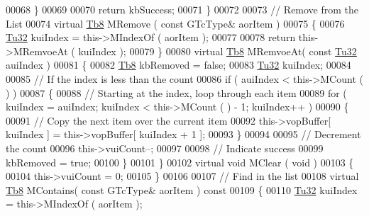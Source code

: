 \begin{DoxyCode}
00068             \}
00069 
00070             \textcolor{keywordflow}{return} kbSuccess;
00071          \}
00072          
00073          \textcolor{comment}{// Remove from the List}
00074          \textcolor{keyword}{virtual} \mbox{\hyperlink{namespace_g_n_common_a8115dc7ed53b6e5b52e6bfde1632ea74}{Tb8}} MRemove  ( \textcolor{keyword}{const} GTcType& aorItem  )
00075          \{
00076             \mbox{\hyperlink{namespace_g_n_common_a941b527ef318f318aed7903dc832b7e4}{Tu32}} kuiIndex = this->MIndexOf ( aorItem );
00077 
00078             \textcolor{keywordflow}{return} this->MRemvoeAt ( kuiIndex );
00079          \}
00080          \textcolor{keyword}{virtual} \mbox{\hyperlink{namespace_g_n_common_a8115dc7ed53b6e5b52e6bfde1632ea74}{Tb8}} MRemvoeAt( \textcolor{keyword}{const} \mbox{\hyperlink{namespace_g_n_common_a941b527ef318f318aed7903dc832b7e4}{Tu32}}    auiIndex )
00081          \{
00082             \mbox{\hyperlink{namespace_g_n_common_a8115dc7ed53b6e5b52e6bfde1632ea74}{Tb8}}  kbRemoved = \textcolor{keyword}{false};
00083             \mbox{\hyperlink{namespace_g_n_common_a941b527ef318f318aed7903dc832b7e4}{Tu32}} kuiIndex;
00084 
00085             \textcolor{comment}{// If the index is less than the count}
00086             \textcolor{keywordflow}{if} ( auiIndex < this->MCount ( ) )
00087             \{
00088                \textcolor{comment}{// Starting at the index, loop through each item}
00089                \textcolor{keywordflow}{for} ( kuiIndex = auiIndex; kuiIndex < this->MCount ( ) - 1; kuiIndex++ )
00090                \{
00091                   \textcolor{comment}{// Copy the next item over the current item}
00092                   this->vopBuffer[ kuiIndex ] = this->vopBuffer[ kuiIndex + 1 ];
00093                \}
00094 
00095                \textcolor{comment}{// Decrement the count}
00096                this->vuiCount--;
00097 
00098                \textcolor{comment}{// Indicate success}
00099                kbRemoved = \textcolor{keyword}{true};
00100             \}
00101          \}
00102          \textcolor{keyword}{virtual} \textcolor{keywordtype}{void} MClear   ( \textcolor{keywordtype}{void} )
00103          \{
00104             this->vuiCount = 0;
00105          \}
00106 
00107          \textcolor{comment}{// Find in the list}
00108          \textcolor{keyword}{virtual} \mbox{\hyperlink{namespace_g_n_common_a8115dc7ed53b6e5b52e6bfde1632ea74}{Tb8}}  MContains( \textcolor{keyword}{const} GTcType& aorItem )\textcolor{keyword}{ const}
00109 \textcolor{keyword}{         }\{
00110             \mbox{\hyperlink{namespace_g_n_common_a941b527ef318f318aed7903dc832b7e4}{Tu32}} kuiIndex = this->MIndexOf ( aorItem );

\end{DoxyCode}
